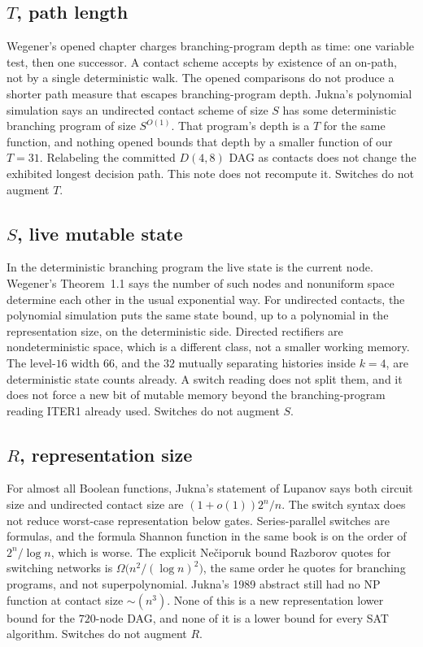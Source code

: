 \documentclass[11pt]{article}
\begin{document}
\subsection*{\(T\), path length}
Wegener's opened chapter charges branching-program depth as time: one variable test, then one successor.
A contact scheme accepts by existence of an on-path, not by a single deterministic walk.
The opened comparisons do not produce a shorter path measure that escapes branching-program depth.
Jukna's polynomial simulation says an undirected contact scheme of size \(S\) has some deterministic branching program of size \(S^{O(1)}\).
That program's depth is a \(T\) for the same function, and nothing opened bounds that depth by a smaller function of our \(T=31\).
Relabeling the committed \(D(4,8)\) DAG as contacts does not change the exhibited longest decision path.
This note does not recompute it.
Switches do not augment \(T\).

\subsection*{\(S\), live mutable state}
In the deterministic branching program the live state is the current node.
Wegener's Theorem~1.1 says the number of such nodes and nonuniform space determine each other in the usual exponential way.
For undirected contacts, the polynomial simulation puts the same state bound, up to a polynomial in the representation size, on the deterministic side.
Directed rectifiers are nondeterministic space, which is a different class, not a smaller working memory.
The level-\(16\) width \(66\), and the \(32\) mutually separating histories inside \(k=4\), are deterministic state counts already.
A switch reading does not split them, and it does not force a new bit of mutable memory beyond the branching-program reading ITER1 already used.
Switches do not augment \(S\).

\subsection*{\(R\), representation size}
For almost all Boolean functions, Jukna's statement of Lupanov says both circuit size and undirected contact size are \((1+o(1))2^n/n\).
The switch syntax does not reduce worst-case representation below gates.
Series-parallel switches are formulas, and the formula Shannon function in the same book is on the order of \(2^n/\log n\), which is worse.
The explicit Ne\v{c}iporuk bound Razborov quotes for switching networks is \(\Omega\bigl(n^2/(\log n)^2\bigr)\), the same order he quotes for branching programs, and not superpolynomial.
Jukna's 1989 abstract still had no NP function at contact size \(\sim(n^3)\).
None of this is a new representation lower bound for the \(720\)-node DAG, and none of it is a lower bound for every SAT algorithm.
Switches do not augment \(R\).
\end{document}
